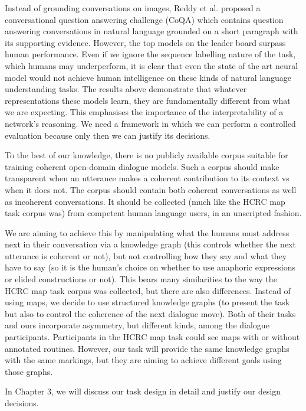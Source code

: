 \documentclass[bsc,frontabs,twoside,singlespacing,parskip,deptreport]{infthesis}     %
\begin{document}
Instead of grounding conversations on images, Reddy et al. \cite{reddy2019coqa} proposed a conversational question answering challenge (CoQA) which contains question answering conversations in natural language grounded on a short paragraph with its supporting evidence. However, the top models on the leader board surpass human performance. Even if we ignore the sequence labelling nature of the task, which humans may underperform, it is clear that even the state of the art neural model would not achieve human intelligence on these kinds of natural language understanding tasks. The results above demonstrate that whatever representations these models learn, they are fundamentally different from what we are expecting. This emphasises the importance of the interpretability of a network's reasoning. We need a framework in which we can perform a controlled evaluation because only then we can justify its decisions.

To the best of our knowledge, there is no publicly available corpus suitable for training coherent open-domain dialogue models. Such a corpus should make transparent when an utterance makes a coherent contribution to its context vs when it does not. The corpus should contain both coherent conversations as well as incoherent conversations. It should be collected (much like the HCRC map task corpus was) from competent human language users, in an unscripted fashion.

We are aiming to achieve this by manipulating what the humans must address next in their conversation via a knowledge graph (this controls whether the next utterance is coherent or not), but not controlling how they say and what they have to say (so it is the human's choice on whether to use anaphoric expressions or elided constructions or not). This bears many similarities to the way the HCRC map task corpus was collected, but there are also differences. Instead of using maps, we decide to use structured knowledge graphs (to present the task but also to control the coherence of the next dialogue move). Both of their tasks and ours incorporate asymmetry, but different kinds, among the dialogue participants. Participants in the HCRC map task could see maps with or without annotated routines. However, our task will provide the same knowledge graphs with the same markings, but they are aiming to achieve different goals using those graphs.

In Chapter 3, we will discuss our task design in detail and justify our design decisions. 
\end{document}
